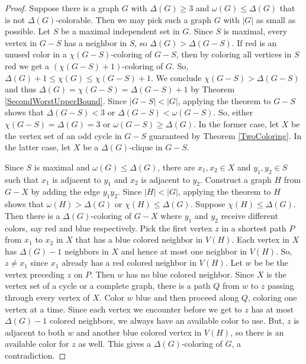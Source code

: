 \documentclass{tufte-book} %
\theoremstyle{plain}
\newcommand{\card}[1]{\left|#1\right|}
\newcommand{\parens}[1]{\left( #1 \right)}
\begin{document}
\begin{proof}
Suppose there is a graph $G$  with $\Delta(G) \ge 3$ and $\omega(G) \le \Delta(G)$ that is not $\Delta(G)$-colorable.  
Then we may pick such a graph $G$ with $\card{G}$ as small as possible.  Let $S$ be 
a maximal independent set in $G$.  Since $S$ is maximal, every vertex in $G-S$ has a neighbor in $S$, so $\Delta(G) > \Delta(G-S)$.
If red is an unused color in a $\chi(G-S)$-coloring of $G-S$, then by coloring all vertices in $S$ red we get a $\parens{\chi(G-S)+1}$-coloring of $G$.  
So, $\Delta(G) + 1 \le \chi(G) \le \chi(G-S) + 1$. We conclude $\chi(G-S) > \Delta(G - S)$ and thus $\Delta(G) = \chi(G-S) = \Delta(G-S) + 1$ by Theorem \ref{SecondWorstUpperBound}.
Since $\card{G-S} < \card{G}$, applying the theorem to $G-S$ shows that $\Delta(G-S) < 3$ or $\Delta(G -S) < \omega(G - S)$.  
So, either $\chi(G-S) = \Delta(G) = 3$ or $\omega(G-S) \ge \Delta(G)$.  In the former case, let $X$ be the vertex set of an odd cycle in $G-S$ guaranteed by Theorem \ref{TwoColoring}.  
In the latter case, let $X$ be a $\Delta(G)$-clique in $G-S$.

Since $S$ is maximal and $\omega(G) \le \Delta(G)$, there are $x_1, x_2 \in X$ and $y_1, y_2 \in S$ such that $x_1$ is adjacent to $y_1$ and $x_2$ is adjacent to $y_2$.
Construct a graph $H$ from $G-X$ by adding the edge $y_1y_2$.  Since $\card{H} < \card{G}$, applying the theorem to $H$ shows that $\omega(H) > \Delta(G)$ or $\chi(H) \le \Delta(G)$.
Suppose $\chi(H) \le \Delta(G)$.  Then there is a $\Delta(G)$-coloring of $G-X$ where $y_1$ and $y_2$ receive different colors, say red and blue respectively.
Pick the first vertex $z$ in a shortest path $P$ from $x_1$ to $x_2$ in $X$ that has a blue colored neighbor in $V(H)$. 
Each vertex in $X$ has $\Delta(G)-1$ neighbors in $X$ and hence at most one neighbor in $V(H)$.  So, $z \ne x_1$ since $x_1$ already has a red colored neighbor in $V(H)$.
Let $w$ be be the vertex preceding $z$ on $P$. Then $w$ has no blue colored neighbor.  Since $X$ is the vertex set of a cycle or a 
complete graph, there is a path $Q$ from $w$ to $z$ passing through every vertex of $X$.  Color $w$ blue and then proceed along $Q$, coloring one vertex at a time.  
Since each vertex we encounter before we get to $z$ has at most $\Delta(G) - 1$ colored neighbors, we always have an available color to use.  But, $z$ is adjacent
to both $w$ and another blue colored vertex in $V(H)$, so there is an available color for $z$ as well.  This gives a $\Delta(G)$-coloring of $G$, a contradiction.


\end{proof}
\end{document}
